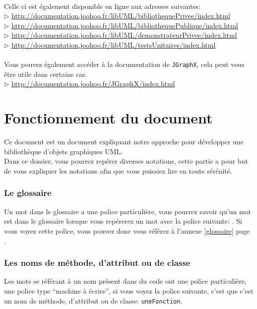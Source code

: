 	\paragraph{}
	Celle ci est également disponible en ligne aux adresses suivantes: \\
	$\rhd$ \url{http://documentation.joohoo.fr/libUML/bibliothequePrivee/index.html}\\
	$\rhd$ \url{http://documentation.joohoo.fr/libUML/bibliothequePublique/index.html}\\
	$\rhd$ \url{http://documentation.joohoo.fr/libUML/demonstrateurPrivee/index.html}\\\label{docDemonstrateur}
	$\rhd$ \url{http://documentation.joohoo.fr/libUML/testsUnitaires/index.html}\\
	\paragraph{}
	Vous pouvez également accéder à la documentation de \texttt{JGraphX}, cela peut vous être utile dans certains cas.\\
	$\rhd$ \url{http://documentation.joohoo.fr/JGraphX/index.html}\\ 


	\newpage
\section*{Fonctionnement du document}
Ce document est un document expliquant notre approche pour développer une bibliothèque d'objets graphiques UML.\\

Dans ce dossier, vous pourrez repérer diverses notations, cette partie a pour but de vous expliquer les notations afin
que vous puissiez lire en toute sérénité.
\subsubsection*{Le glossaire}
Un mot dans le glossaire a une police particulière, vous pourrez savoir qu'un mot est dans le glossaire lorsque vous repérerez un mot avec la police suivante: 
. Si vous voyez cette police, vous pouvez donc vous référez à l'annexe \ref{glossaire} page \pageref{glossaire}.
\subsubsection*{Les noms de méthode, d'attribut ou de classe}
Les mots se référant à un nom présent dans du code ont une police particulière, une police type ``machine à écrire'', si vous voyez la police suivante, c'est que c'est un nom 
de méthode, d'attribut ou de classe: \texttt{uneFonction}.
